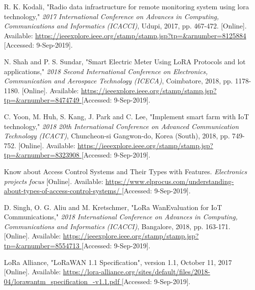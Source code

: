 \begin{thebibliography}{9}
R. K. Kodali, "Radio data infrastructure for remote monitoring system using lora technology," \textit{2017 International Conference on Advances in Computing, Communications and Informatics (ICACCI)}, Udupi, 2017, pp. 467-472.
[Online]. Available:
\url{
https://ieeexplore.ieee.org/stamp/stamp.jsp?tp=&arnumber=8125884
}
[Accessed: 9-Sep-2019].


N. Shah and P. S. Sundar, "Smart Electric Meter Using LoRA Protocols and lot applications," \textit{2018 Second International Conference on Electronics, Communication and Aerospace Technology (ICECA)}, Coimbatore, 2018, pp. 1178-1180.
[Online]. Available:
\url{
https://ieeexplore.ieee.org/stamp/stamp.jsp?tp=&arnumber=8474749
}
[Accessed: 9-Sep-2019].



C. Yoon, M. Huh, S. Kang, J. Park and C. Lee, "Implement smart farm with IoT technology," \textit{2018 20th International Conference on Advanced Communication Technology (ICACT)}, Chuncheon-si Gangwon-do, Korea (South), 2018, pp. 749-752.
[Online]. Available:
\url{
https://ieeexplore.ieee.org/stamp/stamp.jsp?tp=&arnumber=8323908
}
[Accessed: 9-Sep-2019].


Know about Access Control Systems and Their Types with Features. \textit{Electronics projects focus}
[Online]. Available:
\url{
https://www.elprocus.com/understanding-about-types-of-access-control-systems/
}
[Accessed: 9-Sep-2019].



D. Singh, O. G. Aliu and M. Kretschmer, "LoRa WanEvaluation for IoT Communications," \textit{2018 International Conference on Advances in Computing, Communications and Informatics (ICACCI)}, Bangalore, 2018, pp. 163-171.
[Online]. Available:
\url{
https://ieeexplore.ieee.org/stamp/stamp.jsp?tp=&arnumber=8554713
}
[Accessed: 9-Sep-2019].


LoRa Alliance, "LoRaWAN 1.1 Specification", version 1.1, October 11, 2017
[Online]. Available:
\url{
https://lora-alliance.org/sites/default/files/2018-04/lorawantm_specification_-v1.1.pdf
}
[Accessed: 9-Sep-2019].




\end{thebibliography}
